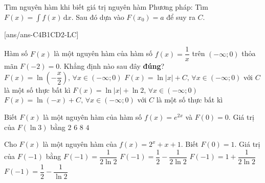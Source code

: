 \begin{dang}{Tìm nguyên hàm khi biết giá trị nguyên hàm}
	Phương pháp: Tìm $F(x)=\int f(x)\mathrm{\,d}x$. Sau đó dựa vào $F(x_0)=a$ để suy ra $C$.
\end{dang}
[ans/ans-C4B1CD2-LC]
\begin{ex}%
Hàm số $F(x)$ là một nguyên hàm của hàm số $f(x)=\dfrac{1}{x}$ trên $(-\infty;0)$ thỏa mãn $F(-2)=0$. Khẳng định nào sau đây \textbf{đúng}?
\choice
{\True $F(x)=\ln \left(-\dfrac{x}{2} \right),\,\forall x\in (-\infty;0)$}
{$F(x)=\ln \left|x\right|+C,\,\forall x\in (-\infty;0)$ với $C$ là một số thực bất kì}
{$F(x)=\ln \left|x\right|+\ln 2,\,\forall x\in (-\infty;0)$}
{$F(x)=\ln \left(-x\right)+C,\,\forall x\in (-\infty;0)$ với $C$ là một số thực bất kì}
\end{ex}

\begin{ex}%
Biết $F(x)$ là một nguyên hàm của hàm số $f(x)=e^{2x}$ và $F(0)=0$. Giá trị của $F(\ln 3)$ bằng
\choice
{$2$}
{$6$}
{$8$}
{\True $4$}
\end{ex}

\begin{ex}%
Cho $F(x)$ là một nguyên hàm của $f(x)=2^x+x+1$. Biết $F(0)=1$. Giá trị của $F(-1)$ bằng
\choice
{$F(-1)=\dfrac{1}{2\ln 2}$}
{\True $F(-1)=\dfrac{1}{2}-\dfrac{1}{2\ln 2}$}
{$F(-1)=1+\dfrac{1}{2\ln 2}$}
{$F(-1)=\dfrac{1}{2}-\dfrac{1}{\ln 2}$}
\end{ex}

